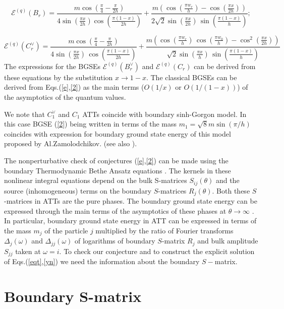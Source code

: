 \documentclass[a4paper,12pt,titlepage,final]{article}
\begin{document}
\begin{equation}
\mathcal{E}^{(q)}(B_{r})=\frac{m\cos (\frac{\pi }{4}-\frac{\pi }{2h})}{4\sin
(\frac{\pi x}{2h})\cos (\frac{\pi (1-x)}{2h})}+
\frac{m(\cos (\frac{\pi w_{r}}{h})-
\cos (\frac{\pi x}{2h}))}{2\sqrt{2}\sin (\frac{\pi x}{2h})
\,\sin (\frac{\pi (1-x)}{h})};  \label{e}
\end{equation}

\begin{equation}
\mathcal{E}^{(q)}(C_{r}^{\vee })=\frac{m\cos (\frac{\pi }{4}-
\frac{\pi }{2h})}{4\sin (\frac{\pi x}{2h})
\,\cos (\frac{\pi (1-x)}{2h})}+\frac{m(\cos (\frac{\pi w_{r}}{h})
\,\cos (\frac{\pi w_{0}}{h})-
\cos ^{2}(\frac{\pi x}{2h}))}{\sqrt{2}
\sin (\frac{\pi x}{h})\,\sin (\frac{\pi (1-x)}{h})}  \label{2}
\end{equation}
The expressions for the BGSEs $\mathcal{E}^{(q)}(B_{r}^{\vee })$ and
$\mathcal{E}^{(q)}(C_{r})$ can be derived from these equations by the
substitution $x\rightarrow 1-x$. The classical BGSEs can be derived
from Eqs.(\ref{e},\ref{2}) as the main terms
($O(1/x)$ or $O(1/(1-x))$) of the asymptotics of the quantum values.

We note that $C_{1}^{\vee }$ and $C_{1}$ ATTs coincide with boundary
sinh-Gorgon model. In this case BGSE (\ref{2}) being written in terms of the
mass $m_{1}=\sqrt{8}m\sin (\pi /h)$ coincides with expression for boundary
ground state energy of this model proposed by Al.Zamolodchikov.
\cite{AlZ} (see also \cite{MRD}).

The nonperturbative check of conjectures (\ref{e},\ref{2}) can be made using
the boundary Thermodynamic Bethe Ansatz equations \cite{SSM}.
The kernels in these
nonlinear integral equations depend on the bulk S-matrices $S_{ij}(\theta)$
and the source (inhomogeneous) terms on the boundary $S$-matrices
$R_{j}(\theta )$. Both these $S$-matrices in ATTs are the pure phases.
The  boundary ground state energy can be expressed through
the main terms of the asymptotics of these phases at
$\theta\rightarrow \infty$ \cite{PDRT}.
In particular, boundary ground state energy in ATT can be expressed
in terms of the
mass $m_{j}$ of the particle $j$ multiplied by the ratio of Fourier
transforms $\Delta_j(\omega)$ and $\Delta_{jj}(\omega)$  of logarithms of
boundary $S$-matrix $R_{j}$ and bulk amplitude
$S_{jj}$ taken at $\omega =i$. To check our conjecture and to construct the
explicit solution of Eqs.(\ref{eqt},\ref{yn}) we need the information about
the boundary $S-$matrix.

\section{Boundary S-matrix}
\end{document}
